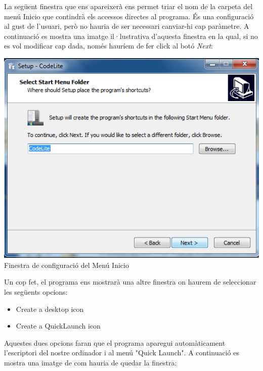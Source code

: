 \documentclass[11pt]{article}
\begin{document}
\newpage

\noindent La següent finestra que ens apareixerà ens permet triar el nom de la carpeta del menú Inicio que contindrà els accessos directes al programa. És una configuració al gust de l'usuari, però no hauria de ser necessari canviar-hi cap paràmetre. A continuació es mostra una imatge il·lustrativa d'aquesta finestra en la qual, si no es vol modificar cap dada, només hauríem de fer click al botó \textit{Next}:

\begin{center}
\includegraphics[scale=0.5]{img/Installer_7.png}\\
\small{Finestra de configuració del Menú Inicio}
\end{center}

\noindent Un cop fet, el programa ens mostrarà una altre finestra on haurem de seleccionar les següents opcions:

\begin{itemize}
	\item Create a desktop icon
	\item Create a QuickLaunch icon
\end{itemize}

\newpage

\noindent Aquestes dues opcions faran que el programa aparegui automàticament l'escriptori del nostre ordinador i al menú "Quick Launch". A continuació es mostra una imatge de com hauria de quedar la finestra:
\end{document}

